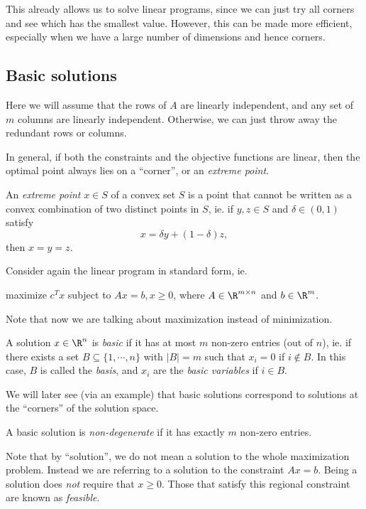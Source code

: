 \documentclass[a4paper]{article}
\begin{document}
This already allows us to solve linear programs, since we can just try all corners and see which has the smallest value. However, this can be made more efficient, especially when we have a large number of dimensions and hence corners.

\subsection{Basic solutions}
Here we will assume that the rows of $A$ are linearly independent, and any set of $m$ columns are linearly independent. Otherwise, we can just throw away the redundant rows or columns.

In general, if both the constraints and the objective functions are linear, then the optimal point always lies on a ``corner'', or an \emph{extreme point}.

\begin{defi}
  An \emph{extreme point} $x\in S$ of a convex set $S$ is a point that cannot be written as a convex combination of two distinct points in $S$, ie. if $y, z\in S$ and $\delta \in (0, 1)$ satisfy
  \[
    x = \delta y + (1 - \delta) z,
  \]
  then $x = y = z$.
\end{defi}

Consider again the linear program in standard form, ie.
\begin{center}
  maximize $c^T x$ subject to $Ax = b, x \geq 0$, where $A \in \R^{m\times n}$ and $b\in \R^m$.
\end{center}
Note that now we are talking about maximization instead of minimization.

\begin{defi}
  A solution $x\in \R^n$ is \emph{basic} if it has at most $m$ non-zero entries (out of $n$), ie. if there exists a set $B\subseteq \{1, \cdots, n\}$ with $|B| = m$ such that $x_i = 0$ if $i\not\in B$. In this case, $B$ is called the \emph{basis}, and $x_i$ are the \emph{basic variables} if $i\in B$.
\end{defi}
We will later see (via an example) that basic solutions correspond to solutions at the ``corners'' of the solution space.

\begin{defi}
  A basic solution is \emph{non-degenerate} if it has exactly $m$ non-zero entries.
\end{defi}

Note that by ``solution'', we do not mean a solution to the whole maximization problem. Instead we are referring to a solution to the constraint $Ax = b$. Being a solution does \emph{not} require that $x \geq 0$. Those that satisfy this regional constraint are known as \emph{feasible}.
\end{document}
